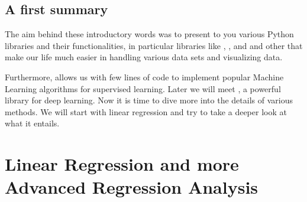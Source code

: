 \documentclass[letterpaper,10pt,english]{sphinxmanual}
\begin{document}
\begin{sphinxVerbatim}[commandchars=\\\{\}]
      
   
\end{sphinxVerbatim}


\subsection{A first summary}
\label{\detokenize{chapter3:a-first-summary}}
The aim behind these introductory words was to present to you various
Python libraries and their functionalities, in particular libraries like
, ,  and  and other that make our life much easier
in handling various data sets and visualizing data.

Furthermore,
 allows us with few lines of code to implement popular
Machine Learning algorithms for supervised learning. Later we will meet , a powerful library for deep learning.
Now it is time to dive more into the details of various methods. We will start with linear regression and try to take a deeper look at what it entails.


\section{Linear Regression and more Advanced Regression Analysis}
\label{\detokenize{chapter4:linear-regression-and-more-advanced-regression-analysis}}\label{\detokenize{chapter4::doc}}
\end{document}
